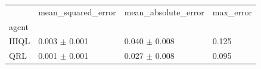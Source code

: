 \begin{tabular}{llll}
\toprule
 & mean_squared_error & mean_absolute_error & max_error \\
agent &  &  &  \\
\midrule
HIQL & 0.003 $\pm$ 0.001 & 0.040 $\pm$ 0.008 & 0.125 \\
QRL & 0.001 $\pm$ 0.001 & 0.027 $\pm$ 0.008 & 0.095 \\
\bottomrule
\end{tabular}
